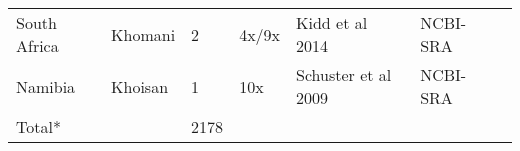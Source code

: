\begin{landscape}
\begin{longtable}{lllllll}
South Africa & Khomani & 2 & 4x/9x & Kidd et al 2014 & NCBI-SRA \\
Namibia & Khoisan & 1 & 10x & Schuster et al 2009 & NCBI-SRA \\
Total* &  & 2178 &  &  & 
}
\end{longtable}
\end{landscape}
